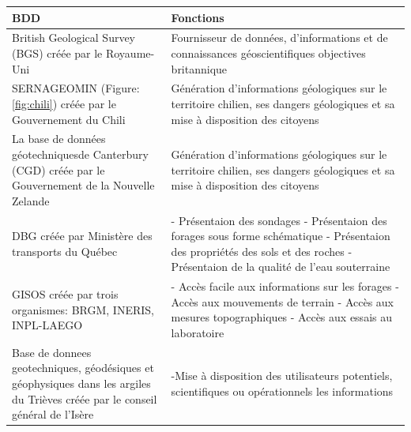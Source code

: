 \par    
\begin{table}
        \centering
        \begin{tabular}{|p{0.40\linewidth}|p{0.60\linewidth}|}
        \hline
                \textbf{BDD} & \textbf{Fonctions} \\
                \hline
                    British Geological Survey (BGS) créée par le
                    Royaume-Uni&
                    Fournisseur de données, 
                    d’informations et de connaissances 
                    géoscientifiques objectives britannique
                         \\
                \hline
                    SERNAGEOMIN (Figure:\ref{fig:chili}) créée par le
                    Gouvernement du Chili&
                    Génération 
                    d'informations géologiques sur le territoire 
                    chilien, ses dangers géologiques et sa mise 
                    à disposition des citoyens
                         \\
                \hline 
                    La base de données géotechniquesde Canterbury (CGD) créée par le
                    Gouvernement de la Nouvelle Zelande&
                    Génération 
                    d'informations géologiques sur le territoire 
                    chilien, ses dangers géologiques et sa mise 
                    à disposition des citoyens
                        \\
                \hline 
                    DBG créée par
                    Ministère des transports du Québec&
                    - Présentaion des sondages
                    - Présentaion des forages sous forme schématique
                    - Présentaion des propriétés des sols et des roches
                    - Présentaion de la qualité de l’eau souterraine
                        \\
                \hline 
                GISOS créée par
                trois organismes: BRGM, INERIS, INPL-LAEGO&
                    - Accès facile aux informations sur les forages
                    - Accès aux mouvements de terrain
                    - Accès aux mesures topographiques
                    - Accès aux essais au laboratoire
                        \\
                \hline 
                Base de donnees geotechniques, géodésiques
                 et géophysiques dans les argiles du Trièves créée par
                 le conseil général de l'Isère&
                        -Mise à disposition des utilisateurs potentiels, scientifiques ou opérationnels les informations

\end{tabular}
\end{table}
